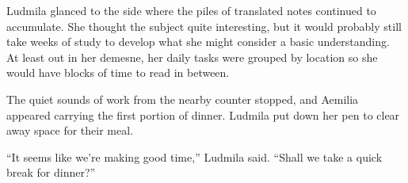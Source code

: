  

Ludmila glanced to the side where the piles of translated notes continued to accumulate. She thought the subject quite interesting, but it would probably still take weeks of study to develop what she might consider a basic understanding. At least out in her demesne, her daily tasks were grouped by location so she would have blocks of time to read in between.

 

The quiet sounds of work from the nearby counter stopped, and Aemilia appeared carrying the first portion of dinner. Ludmila put down her pen to clear away space for their meal.

 

“It seems like we’re making good time,” Ludmila said. “Shall we take a quick break for dinner?”